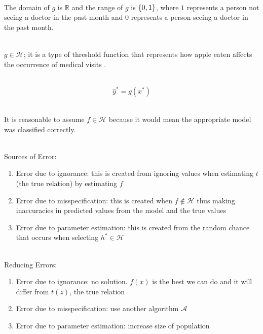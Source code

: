 \documentclass[12pt]{article}
\begin{document}
\begin{enumerate}
 \\ 
The domain of $g$ is $\mathbb{R}$ and the range of $g$ is $\left\{0,1\right\}$, where $1$ represents a person not seeing a doctor in the past month and $0$ represents a person seeing a doctor in the past month. 

 \\ 
$g \in \mathcal{H}$; it is a type of threshold function that represents how apple eaten affects the occurrence of medical visits . 

 \\ 
$$\hat{y}^* = g(x^*)$$ 

 \\
It is reasonable to assume $f \in \mathcal{H}$ because it would mean the appropriate model was classified correctly. 

 \\
Sources of Error: \begin{enumerate} 
\item Error due to ignorance: this is created from ignoring values when estimating $t$ (the true relation) by estimating $f$ 
\item Error due to misspecification: this is created when $f \notin \mathcal{H}$ thus making inaccuracies in predicted values from the model and the true values
\item Error due to parameter estimation: this is created from the random chance that occurs when selecting $h^* \in \mathcal{H}$
\end{enumerate} 

 \\
Reducing Errors: \begin{enumerate} 
\item Error due to ignorance: no solution. $f(x)$ is the best we can do and it will differ from $t(z)$, the true relation
\item Error due to misspecification: use another algorithm $\mathcal{A}$
\item Error due to parameter estimation: increase size of population
\end{enumerate} 


\end{enumerate}
\end{document}
